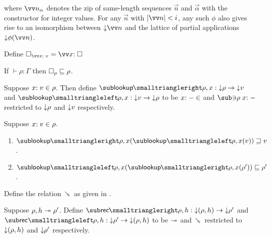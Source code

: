 \noindent where $\vec{\annInt{n}{\alpha}}$ denotes the zip of same-length sequences $\vec{n}$ and $\vec{\alpha}$ with the constructor for integer values. For any $\vec{n}$ with $\length{\vec{n}} \numlt i$, any such $\phi$ also gives rise to an isomorphism between $\Below{\vec{n}}$ and the lattice of partial applications $\Below{\exPrimOp{\phi}{\vec{n}}}$.




\begin{definition}
Define $\hole_{\vec{\bind{x}{v}}} = \vec{\bind{x}{\hole}}$
\end{definition}

\begin{lemma}
\label{lem:core-language:hole-env}If $\vdash \rho: \Gamma$ then $\square_{\rho} \sqsubseteq \rho$.
\end{lemma}

\begin{definition}
   Suppose $x{:}\;v\in{\rho}$. Then define $\envLookupFwdF{\rho,x}: \Below{\rho} \to \Below{v}$ and $\envLookupBwdF{\rho,x}: \Below{v} \to \Below{\rho}$ to be $x{:}\;-\in$ and $\envLookupBwdR{\rho}\bind{x}{-}$ restricted to ${\downarrow}{\rho}$ and ${\downarrow}{v}$ respectively.
\end{definition}

\begin{lemma}
\label{lem:core-language:env-get-put}Suppose $x{:}\;v\in{\rho}$.
\begin{enumerate}
   \item \label{lem:core-language:env-get-put:1} $\envLookupFwdF{\rho,x}(\envLookupBwdF{\rho,x}(v)) \geq v$.
   \item \label{lem:core-language:env-get-put:2} $\envLookupBwdF{\rho,x}(\envLookupFwdF{\rho,x}(\rho')) \leq \rho'$.
\end{enumerate}
\end{lemma}

\begin{definition}
   \label{def:core-language:closeDefs-bwd}
   Define the relation $\closeDefsBwdR$ as given in .
\end{definition}

\begin{definition}
   Suppose $\rho, h \twoheadrightarrow \rho'$. Define $\closeDefsFwdF{\rho,h}: \Below{(\rho, h)} \to \Below{\rho'}$ and $\closeDefsBwdF{\rho,h}: \Below{\rho'} \to \Below{(\rho, h)}$ to be $\twoheadrightarrow$ and $\closeDefsBwdR$ restricted to ${\downarrow}{(\rho, h)}$ and ${\downarrow}{\rho'}$ respectively.
\end{definition}

